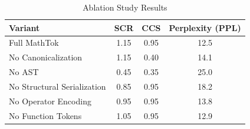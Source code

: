\documentclass{article}
\begin{document}
\begin{table}[h]
\centering
\caption{Ablation Study Results}
\begin{tabular}{@{}lccc@{}}
\toprule
Variant & SCR & CCS & Perplexity (PPL) \\
\midrule
Full MathTok & 1.15 & 0.95 & 12.5 \\
No Canonicalization & 1.15 & 0.40 & 14.1 \\
No AST & 0.45 & 0.35 & 25.0 \\
No Structural Serialization & 0.85 & 0.95 & 18.2 \\
No Operator Encoding & 0.95 & 0.95 & 13.8 \\
No Function Tokens & 1.05 & 0.95 & 12.9 \\
\bottomrule
\end{tabular}
\end{table}
\end{document}
